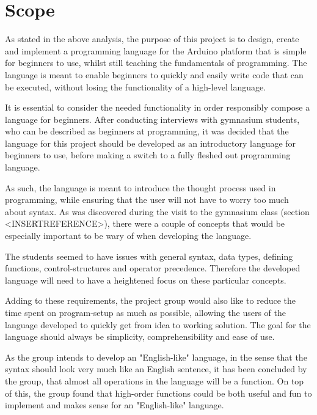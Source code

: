 \section{Scope}
As stated in the above analysis, the purpose of this project is to design, create and implement a programming language for the Arduino platform that is simple for beginners to use, whilst still teaching the fundamentals of programming.
The language is meant to enable beginners to quickly and easily write
code that can be executed, without losing the functionality of a high-level language.

It is essential to consider the needed functionality in order responsibly compose a language for beginners.
After conducting interviews with gymnasium students, who can be described as beginners at programming, it was decided that the language for this project should be developed as an introductory language for beginners to use, before making a switch to a fully fleshed out programming language.

As such, the language is meant to introduce the thought process used in programming, while ensuring that the user will not have to worry too much about syntax.
As was discovered during the visit to the gymnasium class (section <INSERTREFERENCE>), there were a couple of concepts that would be especially important to be wary of when developing the language.

The students seemed to have issues with general syntax, data types, defining functions, control-structures and operator precedence.
Therefore the developed language will need to have a heightened focus on these particular concepts. 

Adding to these requirements, the project group would also like to reduce the time spent on program-setup as much as possible, allowing the users of the language developed to quickly get from idea to working solution.
The goal for the language should always be simplicity, comprehensibility and ease of use.

As the group intends to develop an "English-like" language, in the sense that the syntax should look very much like an English sentence, it has been concluded by the group, that almost all operations in the language will be a function. 
On top of this, the group found that high-order functions could be both useful and fun to implement and makes sense for an "English-like" language. 

